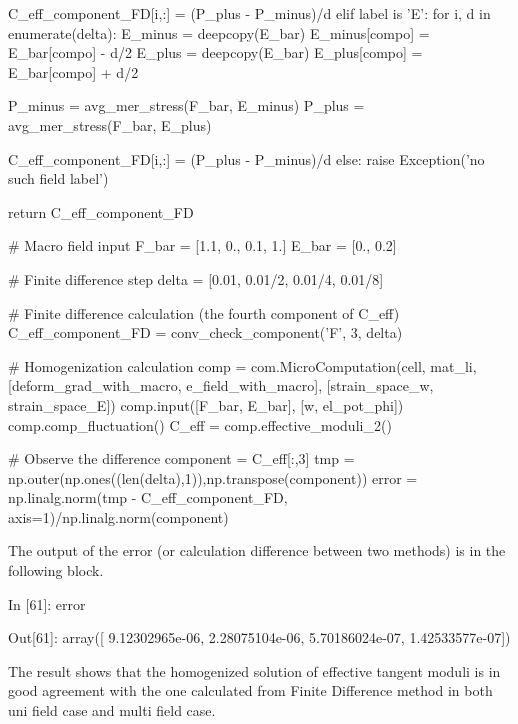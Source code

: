 \begin{python}
            C_eff_component_FD[i,:] = (P_plus - P_minus)/d
    elif label is 'E':
        for i, d in enumerate(delta):
            E_minus = deepcopy(E_bar)
            E_minus[compo] = E_bar[compo] - d/2
            E_plus = deepcopy(E_bar)
            E_plus[compo] = E_bar[compo] + d/2

            P_minus = avg_mer_stress(F_bar, E_minus)
            P_plus  = avg_mer_stress(F_bar, E_plus)
            
            C_eff_component_FD[i,:] = (P_plus - P_minus)/d
    else:
        raise Exception('no such field label')
    
    return C_eff_component_FD 

# Macro field input
F_bar = [1.1, 0., 0.1, 1.]
E_bar = [0., 0.2]

# Finite difference step
delta = [0.01, 0.01/2, 0.01/4, 0.01/8]

# Finite difference calculation (the fourth component of C_eff)
C_eff_component_FD = conv_check_component('F', 3, delta)

# Homogenization calculation 
comp = com.MicroComputation(cell, mat_li,
                        [deform_grad_with_macro, e_field_with_macro],
                        [strain_space_w, strain_space_E])
comp.input([F_bar, E_bar], [w, el_pot_phi])
comp.comp_fluctuation()
C_eff = comp.effective_moduli_2()

# Observe the difference
component = C_eff[:,3]
tmp = np.outer(np.ones((len(delta),1)),np.transpose(component))
error = np.linalg.norm(tmp - C_eff_component_FD, axis=1)/np.linalg.norm(component)
\end{python}

The output of the error (or calculation difference between two methods) is in the following block.
\begin{python}
In [61]: error

Out[61]:
array([  9.12302965e-06,   2.28075104e-06,   5.70186024e-07,
         1.42533577e-07])
\end{python}

The result shows that the homogenized solution of effective tangent moduli is in good agreement with the one calculated from Finite Difference method in both uni field case and multi field case. 

%
%
